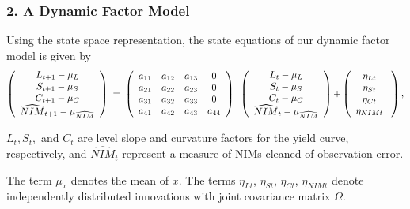 \documentclass[handout]{beamer}
\begin{document}
\begin{frame}
\frametitle{2. A Dynamic Factor Model}
Using the state space
representation, the state equations of our dynamic factor model
is given by
\begin{equation*}
\left(
\begin{array}{c}
{L_{t+1}-\mu _{L}} \\
{S_{t+1}-\mu _{S}} \\
{C_{t+1}-\mu _{C}} \\
\widehat{NIM}_{t+1}-\mu _{\widehat{NIM}}%
\end{array}%
\right) {\normalsize \ =\ }\left(
\begin{array}{cccc}
a_{11} & a_{12} & a_{13} & 0 \\
a_{21} & a_{22} & a_{23} & 0 \\
a_{31} & a_{32} & a_{33} & 0 \\
a_{41} & a_{42} & a_{43} & a_{44}%
\end{array}%
\right) {\normalsize \ }\left(
\begin{array}{c}
{L_{t}-\mu _{L}} \\
{S_{t}-\mu _{S}} \\
{C_{t}-\mu _{C}} \\
\widehat{NIM}_{t}-\mu _{\widehat{NIM}}%
\end{array}%
\right) {\normalsize +}\left(
\begin{array}{c}
{\eta _{Lt}} \\
{\eta _{St}} \\
{\eta _{Ct}} \\
{\eta _{NIMt}}%
\end{array}%
{\normalsize \ }\right) ,
\end{equation*}

$L_{t},S_{t},$ and $C_{t}$ are level slope and curvature factors for
the yield curve, respectively, and $\widehat{NIM}_{t}$ represent a measure
of NIMs cleaned of observation error.

The term $\mu _{x}$ denotes the mean
of $x$. The terms ${\eta _{Lt}}$, ${\eta _{St}}$, ${\eta _{Ct}}$, ${\eta
_{NIMt}}$ denote independently distributed innovations with joint covariance
matrix $\Omega $.

\end{frame}
\end{document}
